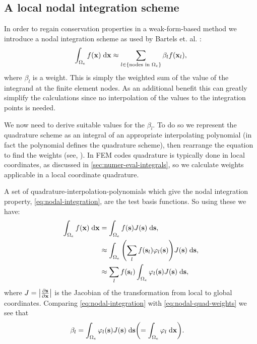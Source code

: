 \subsection{A local nodal integration scheme}
\label{sec:local-nodal-integr}

In order to regain conservation properties in a weak-form-based method we introduce a nodal integration scheme as used by Bartels et. al. \cite{Bartels2006}:
\begin{equation}
  \label{eq:nodal-integration}
  \int_{\Omega_e} f(\boldsymbol{\mathrm{x}}) {\; \mathrm{{d}}} \boldsymbol{\mathrm{x}} \approx \sum_{l\in \left\{ {\text{nodes in $\Omega_e$}} \right\}} \beta_l f(\boldsymbol{\mathrm{x}}_l),
\end{equation}
where $\beta_l$ is a weight.
This is simply the weighted sum of the value of the integrand at the finite element nodes.
As an additional benefit this can greatly simplify the calculations since no interpolation of the values to the integration points is needed.

We now need to derive suitable values for the $\beta_l$.
To do so we represent the quadrature scheme as an integral of an appropriate interpolating polynomial (in fact the polynomial defines the quadrature scheme), then rearrange the equation to find the weights (see, \eg \cite[480]{Kincaid2002}).
In FEM codes quadrature is typically done in local coordinates, as discussed in \cref{sec:numer-eval-integrals}, so we calculate weights applicable in a local coordinate quadrature.

A set of quadrature-interpolation-polynomials which give the nodal integration property, \cref{eq:nodal-integration}, are the test basis functions.
So using these we have:
\begin{equation}
  \label{eq:nodal-quad-weights}
  \begin{aligned}
    \int_{\Omega_e} f(\boldsymbol{\mathrm{x}}) {\; \mathrm{{d}}} \boldsymbol{\mathrm{x}} &= \int_{\Omega_e} f({\boldsymbol{\mathrm{s}}}) J({\boldsymbol{\mathrm{s}}}) {\; \mathrm{{d}}} {\boldsymbol{\mathrm{s}}}, \\
    &\approx \int_{\Omega_e} {\left( \sum_l f({\boldsymbol{\mathrm{s}}}_l) \varphi_l({\boldsymbol{\mathrm{s}}}) \right)} J({\boldsymbol{\mathrm{s}}}) {\; \mathrm{{d}}} {\boldsymbol{\mathrm{s}}}, \\
    &\approx \sum_l f({\boldsymbol{\mathrm{s}}}_l) \int_{\Omega_e} \varphi_l({\boldsymbol{\mathrm{s}}}) J({\boldsymbol{\mathrm{s}}}) {\; \mathrm{{d}}} {\boldsymbol{\mathrm{s}}},
  \end{aligned}
\end{equation}
where $J = \left|{\frac{\partial {\boldsymbol{\mathrm{s}}}}{\partial \boldsymbol{\mathrm{x}}}} \right|$ is the Jacobian of the transformation from local to global coordinates.
Comparing \cref{eq:nodal-integration} with \cref{eq:nodal-quad-weights} we see that
\begin{equation}
  \begin{aligned}
    \beta_l &= \int_{\Omega_e} \varphi_l({\boldsymbol{\mathrm{s}}}) J({\boldsymbol{\mathrm{s}}}) {\; \mathrm{{d}}} {\boldsymbol{\mathrm{s}}} {\left( = \int_{\Omega_e} \varphi_l {\; \mathrm{{d}}}\boldsymbol{\mathrm{x}} \right)}.
  \end{aligned}
\end{equation}

